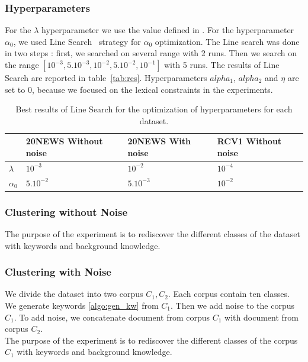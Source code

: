 \subsubsection{Hyperparameters}
For the $\lambda$ hyperparameter we use the value defined in \cite{Deap-K-Means}. 
For the hyperparameter $\alpha_0$, we used Line Search~\cite{SWANN1969S39} strategy for 
$\alpha_0$ optimization. The Line search was done in two steps :
first, we searched on several range with 2 runs. Then we search on the range 
$[10^{-3},5.10^{-3},10^{-2},5.10^{-2},10^{-1}]$ with 5 runs.   
The results of Line Search are reported 
in table~\ref{tab:res}. Hyperparameters $alpha_1$, $alpha_2$ and $\eta$ 
are set to 0, because we focused on the lexical constraints in the experiments. 
\begin{table}[!h]
\centering
  \begin{tabular}{| l | l | l | l |}
    \hline
               & 20NEWS Without noise & 20NEWS With noise & RCV1 Without noise 
\\ \hline
    $\lambda$  & $10^{-3}$            & $10^{-2}$         & $10^{-4}$           
\\ \hline
    $\alpha_0$ & $5.10^{-2}$          & $5.10^{-3}$       & $10^{-2}$           
\\ \hline
  \end{tabular}
  \caption{\label{tab2}Best results of Line Search for the optimization of
hyperparameters for each dataset.}
\end{table}
\subsubsection{\label{section:test1}Clustering without Noise}
The purpose of the experiment is to rediscover the different classes of the
dataset with keywords and background knowledge.

\subsubsection{\label{section:test2}Clustering with Noise}
We divide the dataset into two corpus $C_1, C_2$. Each corpus contain
ten classes. We generate keywords \ref{algo:gen_kw} from $C_1$. Then we 
add noise to the corpus
$C_1$. To add noise, we concatenate document from corpus $C_1$ with document
from corpus $C_2$.
\\The purpose of the experiment is to rediscover the different classes of the
corpus $C_1$ with keywords and background knowledge.

